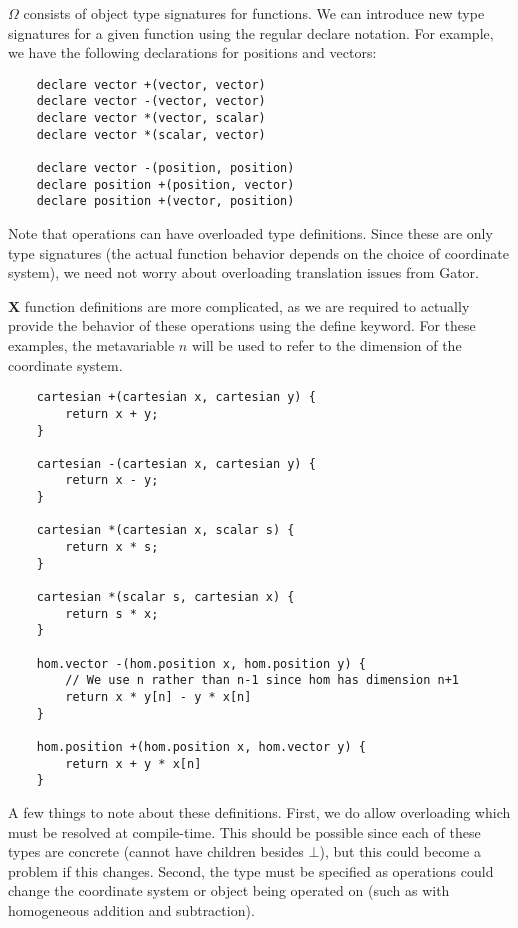 \documentclass{article}
\newcommand{\Chi}{\mathbf{X}}
\begin{document}
$\Omega$ consists of object type signatures for functions.  We can introduce new type signatures for a given function using the regular \textsf{declare} notation.  For example, we have the following declarations for \textsf{positions} and \textsf{vectors}:

\begin{lstlisting}
	declare vector +(vector, vector)
	declare vector -(vector, vector)
	declare vector *(vector, scalar)
	declare vector *(scalar, vector)
	
	declare vector -(position, position)
	declare position +(position, vector)
	declare position +(vector, position)
\end{lstlisting}

Note that operations can have overloaded type definitions.  Since these are only type signatures (the actual function behavior depends on the choice of coordinate system), we need not worry about overloading translation issues from Gator.

$\Chi$ function definitions are more complicated, as we are required to actually provide the behavior of these operations using the \textsf{define} keyword.  For these examples, the metavariable $n$ will be used to refer to the dimension of the coordinate system.

\begin{lstlisting}
	cartesian +(cartesian x, cartesian y) {
		return x + y;
	}
	
	cartesian -(cartesian x, cartesian y) {
		return x - y;
	}
	
	cartesian *(cartesian x, scalar s) {
		return x * s;
	}

	cartesian *(scalar s, cartesian x) {
		return s * x;
	}
	
	hom.vector -(hom.position x, hom.position y) {
		// We use n rather than n-1 since hom has dimension n+1
		return x * y[n] - y * x[n]
	}
	
	hom.position +(hom.position x, hom.vector y) {
		return x + y * x[n]
	}
\end{lstlisting}

A few things to note about these definitions.  First, we do allow overloading which must be resolved at compile-time.  This should be possible since each of these types are concrete (cannot have children besides $\bot$), but this could become a problem if this changes.  Second, the type must be specified as operations could change the coordinate system or object being operated on (such as with homogeneous addition and subtraction).
\end{document}
